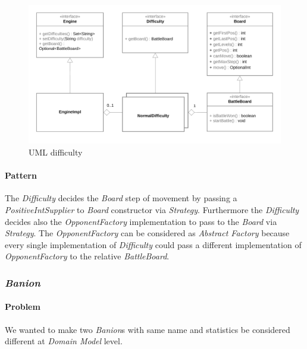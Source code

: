 \documentclass[12pt, a4paper]{report}
\begin{document}
            \begin{figure}[ht]
            \centering{}
            \caption{UML difficulty}
            \includegraphics[width=\textwidth]{difficulty}
            \end{figure}

            \paragraph{Pattern}

            The \emph{Difficulty} decides the \emph{Board} step of movement by passing a \emph{PositiveIntSupplier} to \emph{Board} constructor via \emph{Strategy}.
            Furthermore the \emph{Difficulty} decides also the \emph{OpponentFactory} implementation to pass to the \emph{Board} via \emph{Strategy}.
            The \emph{OpponentFactory} can be considered as \emph{Abstract Factory} because every single implementation of \emph{Difficulty} could pass
            a different implementation of \emph{OpponentFactory} to the relative \emph{BattleBoard}.
            
        \pagebreak

        \subsubsection{\emph{Banion}}

            \paragraph{Problem}

            We wanted to make two \emph{Banion}s with same name and statistics be considered different at \emph{Domain Model} level.
\end{document}
